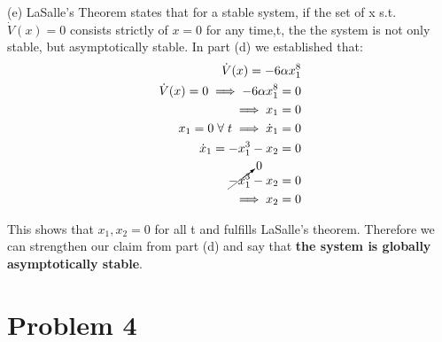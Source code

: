 \documentclass{article}
\begin{document}
  (e) LaSalle's Theorem states that for a stable system, if the set of
  x s.t. $\dot{V}(x)=0$ consists strictly of $x=0$ for any time,t, the the system is not only
  stable, but asymptotically stable. \newline
  In part (d) we established that:
  \begin{align*}
    \dot{V}(x) = -6\alpha x_1^8 \\
    \dot{V}(x) = 0 \implies -6\alpha x_1^8 = 0 \\
    \implies x_1 =0 \\
    x_1=0 \hspace{1.0mm} \forall \hspace{1.0mm} t \implies \dot{x}_1=0 \\
    \dot{x}_1 = -x_1^3 - x_2 = 0 \\
    \cancelto{0}{-x_1^3} - x_2 = 0 \\
    \implies x_2 = 0
  \end{align*}

  This shows that $x_1, x_2=0$ for all t and fulfills LaSalle's theorem.
  Therefore we can strengthen our claim from part (d) and say that \textbf{the
    system is globally asymptotically stable}.

  \newpage

  \section{Problem 4}
\end{document}
